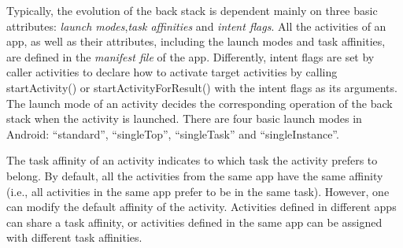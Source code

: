 Typically, the evolution of the back stack is dependent mainly on three basic attributes: \emph{launch modes},\emph{task affinities} and \emph{intent flags}. All the activities of an app, as well as their attributes, including the launch modes and task affinities, are defined in the \emph{manifest file} of the app. Differently, intent flags are set by caller activities to declare how to activate target activities by calling startActivity() or startActivityForResult() with the intent flags as its arguments. The launch mode of an activity decides the corresponding operation of the back stack when the activity is launched. There are four basic launch modes in Android: ``standard'', ``singleTop'', ``singleTask'' and ``singleInstance''. 

The task affinity of an activity indicates to which task the activity prefers to belong. By default, all the activities from the same app have the same affinity (i.e., all activities in the same app prefer to be in the same task). However, one can modify the default affinity of the activity. Activities defined in different apps can share a task affinity, or activities defined in the same app can be assigned with different task affinities. 


